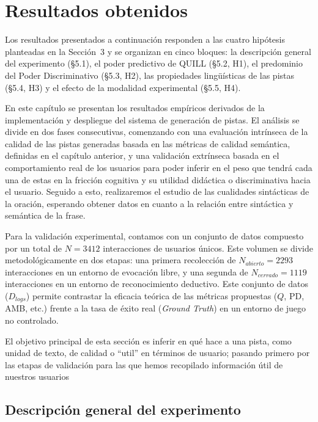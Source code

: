 \documentclass[../main.tex]{subfiles}
\begin{document}
\section{Resultados obtenidos}

Los resultados presentados a continuación responden a las cuatro hipótesis planteadas en la Sección~3 y se organizan en cinco bloques: la descripción general del experimento (§5.1), el poder predictivo de QUILL (§5.2, H1), el predominio del Poder Discriminativo (§5.3, H2), las propiedades lingüísticas de las pistas (§5.4, H3) y el efecto de la modalidad experimental (§5.5, H4).

En este capítulo se presentan los resultados empíricos derivados de la implementación y despliegue del sistema de generación de pistas. El análisis se divide en dos fases consecutivas, comenzando con una evaluación intrínseca de la calidad de las pistas generadas basada en las métricas de calidad semántica, definidas en el capítulo anterior, y una validación extrínseca basada en el comportamiento real de los usuarios para poder inferir en el peso que tendrá cada una de estas en la fricción cognitiva y su utilidad didáctica o discriminativa hacia el usuario. Seguido a esto, realizaremos el estudio de las cualidades sintácticas de la oración, esperando obtener datos en cuanto a la relación entre sintáctica y semántica de la frase.

Para la validación experimental, contamos con un conjunto de datos compuesto por un total de $N=3412$ interacciones de usuarios únicos. Este volumen se divide metodológicamente en dos etapas: una primera recolección de $N_{abierto}=2293$ interacciones en un entorno de evocación libre, y una segunda de $N_{cerrado}=1119$ interacciones en un entorno de reconocimiento deductivo. Este conjunto de datos ($D_{logs}$) permite contrastar la eficacia teórica de las métricas propuestas ($Q$, PD, AMB, etc.) frente a la tasa de éxito real (\textit{Ground Truth}) en un entorno de juego no controlado.

El objetivo principal de esta sección es inferir en qué hace a una pista, como unidad de texto, de calidad o ``util'' en términos de usuario; pasando primero por las etapas de validación para las que hemos recopilado información útil de nuestros usuarios

\subsection{Descripción general del experimento}
\end{document}
